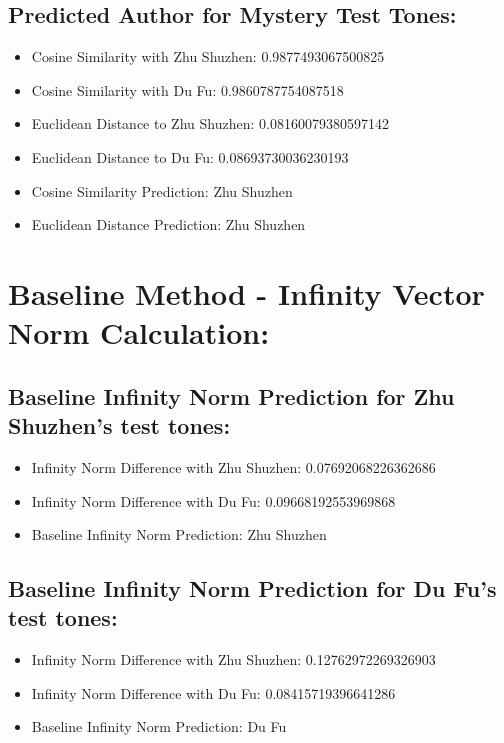 \documentclass[12pt]{article}
\begin{document}
\subsection*{Predicted Author for Mystery Test Tones:}

\begin{itemize}
    \item Cosine Similarity with Zhu Shuzhen: 0.9877493067500825
    \item Cosine Similarity with Du Fu: 0.9860787754087518
    \item Euclidean Distance to Zhu Shuzhen: 0.08160079380597142
    \item Euclidean Distance to Du Fu: 0.08693730036230193
    \item Cosine Similarity Prediction: Zhu Shuzhen
    \item Euclidean Distance Prediction: Zhu Shuzhen
\end{itemize}

\section*{Baseline Method - Infinity Vector Norm Calculation: }

\subsection*{Baseline Infinity Norm Prediction for Zhu Shuzhen's test tones:}

\begin{itemize}
    \item Infinity Norm Difference with Zhu Shuzhen: 0.07692068226362686
    \item Infinity Norm Difference with Du Fu: 0.09668192553969868
    \item Baseline Infinity Norm Prediction: Zhu Shuzhen
\end{itemize}

\subsection*{Baseline Infinity Norm Prediction for Du Fu's test tones:}


\begin{itemize}
    \item Infinity Norm Difference with Zhu Shuzhen: 0.12762972269326903
    \item Infinity Norm Difference with Du Fu: 0.08415719396641286
    \item Baseline Infinity Norm Prediction: Du Fu
\end{itemize}
\end{document}
